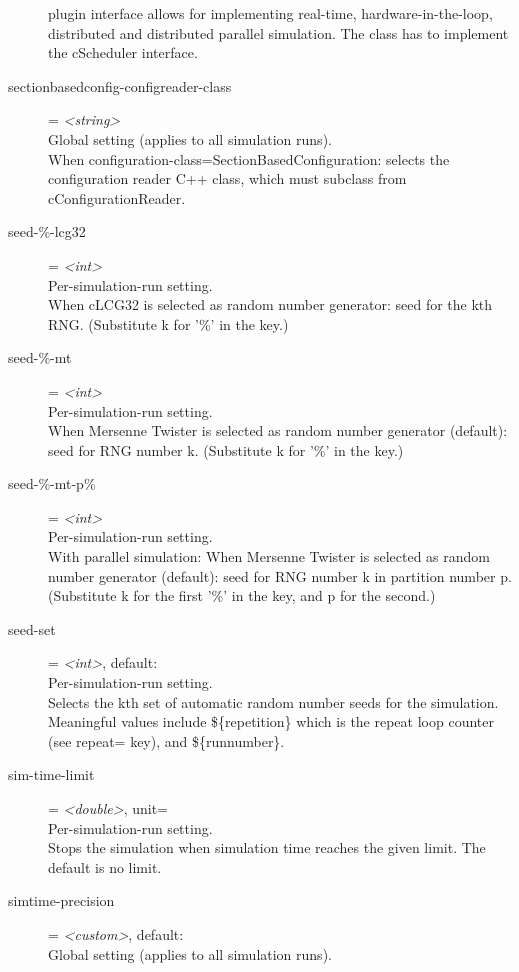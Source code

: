 \begin{description}
    plugin interface allows for implementing real-time, hardware-in-the-loop,
    distributed and distributed parallel simulation. The class has to implement
    the cScheduler interface.
\item[sectionbasedconfig-configreader-class] = \textit{<string>}\\
    Global setting (applies to all simulation runs).\\
    When configuration-class=SectionBasedConfiguration: selects the
    configuration reader C++ class, which must subclass from
    cConfigurationReader.
\item[seed-\%-lcg32] = \textit{<int>}\\
    Per-simulation-run setting.\\
    When cLCG32 is selected as random number generator: seed for the kth RNG.
    (Substitute k for '\%' in the key.)
\item[seed-\%-mt] = \textit{<int>}\\
    Per-simulation-run setting.\\
    When Mersenne Twister is selected as random number generator (default):
    seed for RNG number k. (Substitute k for '\%' in the key.)
\item[seed-\%-mt-p\%] = \textit{<int>}\\
    Per-simulation-run setting.\\
    With parallel simulation: When Mersenne Twister is selected as random
    number generator (default): seed for RNG number k in partition number p.
    (Substitute k for the first '\%' in the key, and p for the second.)
\item[seed-set] = \textit{<int>}, default: \\
    Per-simulation-run setting.\\
    Selects the kth set of automatic random number seeds for the simulation.
    Meaningful values include \$\{repetition\} which is the repeat loop counter
    (see repeat= key), and \$\{runnumber\}.
\item[sim-time-limit] = \textit{<double>}, unit=\\
    Per-simulation-run setting.\\
    Stops the simulation when simulation time reaches the given limit. The
    default is no limit.
\item[simtime-precision] = \textit{<custom>}, default: \\
    Global setting (applies to all simulation runs).\\

\end{description}
